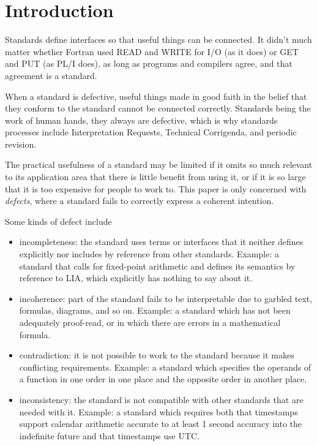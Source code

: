 \documentclass{article}
\begin{document}
\section{Introduction}

Standards define interfaces so that useful things can be connected.
It didn't much matter whether Fortran used READ and WRITE for I/O
(as it does) or GET and PUT (as PL/I does), as long as programs
and compilers agree, and that agreement is a standard.

When a standard is defective, useful things made in good faith
in the belief that they conform to the standard cannot be connected
correctly.  Standards being the work of human hands, they always
are defective, which is why standards processes include Interpretation
Requests, Technical Corrigenda, and periodic revision.

The practical usefulness of a standard may be limited if it omits
so much relevant to its application area that there is little benefit
from using it, or if it is so large that it is too expensive for
people to work to.  This paper is only concerned with {\it defects},
where a standard fails to correctly express a coherent intention.

Some kinds of defect include
\begin{itemize}
\item incompleteness: the standard uses terms or interfaces that it
neither defines explicitly nor includes by reference from other standards.
Example: a standard that calls for fixed-point arithmetic and
defines its semantics by reference to LIA, which explicitly has nothing
to say about it.
\item incoherence: part of the standard fails to be interpretable due
to garbled text, formulas, diagrams, and so on.
Example: a standard which has not been adequately proof-read, or in
which there are errors in a mathematical formula.
\item contradiction: it is not possible to work to the standard because
it makes conflicting requirements.  Example: a standard which specifies
the operands of a function in one order in one place and the opposite
order in another place.
\item inconsistency: the standard is not compatible with other
standards that are needed with it.  Example: a standard which
requires both that timestamps support calendar arithmetic accurate
to at least 1 second accuracy into the indefinite future and that
timestamps use UTC.
\end{itemize}
\end{document}
